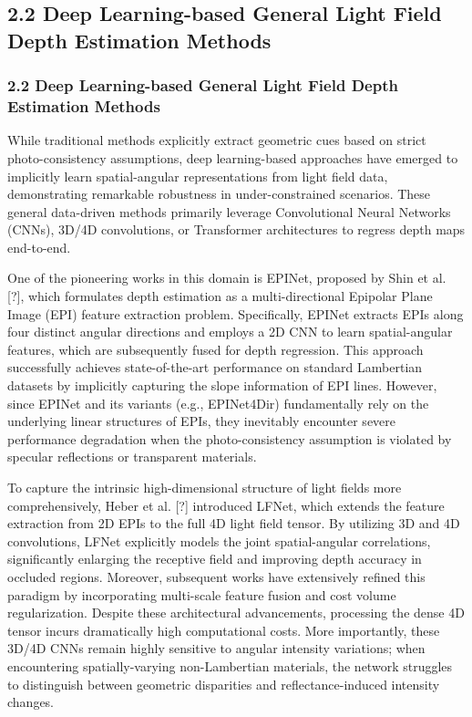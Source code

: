 \documentclass[journal]{IEEEtran}
\begin{document}
\subsection{2.2 Deep Learning-based General Light Field Depth Estimation Methods}

\subsubsection{2.2 Deep Learning-based General Light Field Depth Estimation Methods}

While traditional methods explicitly extract geometric cues based on strict photo-consistency assumptions, deep learning-based approaches have emerged to implicitly learn spatial-angular representations from light field data, demonstrating remarkable robustness in under-constrained scenarios. These general data-driven methods primarily leverage Convolutional Neural Networks (CNNs), 3D/4D convolutions, or Transformer architectures to regress depth maps end-to-end.

One of the pioneering works in this domain is EPINet, proposed by Shin et al. [?], which formulates depth estimation as a multi-directional Epipolar Plane Image (EPI) feature extraction problem. Specifically, EPINet extracts EPIs along four distinct angular directions and employs a 2D CNN to learn spatial-angular features, which are subsequently fused for depth regression. This approach successfully achieves state-of-the-art performance on standard Lambertian datasets by implicitly capturing the slope information of EPI lines. However, since EPINet and its variants (e.g., EPINet4Dir) fundamentally rely on the underlying linear structures of EPIs, they inevitably encounter severe performance degradation when the photo-consistency assumption is violated by specular reflections or transparent materials.

To capture the intrinsic high-dimensional structure of light fields more comprehensively, Heber et al. [?] introduced LFNet, which extends the feature extraction from 2D EPIs to the full 4D light field tensor. By utilizing 3D and 4D convolutions, LFNet explicitly models the joint spatial-angular correlations, significantly enlarging the receptive field and improving depth accuracy in occluded regions. Moreover, subsequent works have extensively refined this paradigm by incorporating multi-scale feature fusion and cost volume regularization. Despite these architectural advancements, processing the dense 4D tensor incurs dramatically high computational costs. More importantly, these 3D/4D CNNs remain highly sensitive to angular intensity variations; when encountering spatially-varying non-Lambertian materials, the network struggles to distinguish between geometric disparities and reflectance-induced intensity changes.
\end{document}
